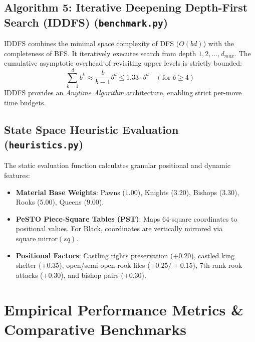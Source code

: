 \documentclass[11pt,a4paper]{article}
\begin{document}
\subsection{Algorithm 5: Iterative Deepening Depth-First Search (IDDFS) (\texttt{benchmark.py})}
IDDFS combines the minimal space complexity of DFS ($O(bd)$) with the completeness of BFS. It iteratively executes search from depth $1, 2, \dots, d_{max}$. The cumulative asymptotic overhead of revisiting upper levels is strictly bounded:
$$\sum_{k=1}^{d} b^k \approx \frac{b}{b-1} b^d \le 1.33 \cdot b^d \quad (\text{for } b \ge 4)$$
IDDFS provides an \textit{Anytime Algorithm} architecture, enabling strict per-move time budgets.

\subsection{State Space Heuristic Evaluation (\texttt{heuristics.py})}
The static evaluation function calculates granular positional and dynamic features:
\begin{itemize}[leftmargin=*]
    \item \textbf{Material Base Weights}: Pawns ($1.00$), Knights ($3.20$), Bishops ($3.30$), Rooks ($5.00$), Queens ($9.00$).
    \item \textbf{PeSTO Piece-Square Tables (PST)}: Maps 64-square coordinates to positional values. For Black, coordinates are vertically mirrored via $\text{square\_mirror}(sq)$.
    \item \textbf{Positional Factors}: Castling rights preservation ($+0.20$), castled king shelter ($+0.35$), open/semi-open rook files ($+0.25 / +0.15$), 7th-rank rook attacks ($+0.30$), and bishop pairs ($+0.30$).
\end{itemize}

\section{Empirical Performance Metrics \& Comparative Benchmarks}
\end{document}
